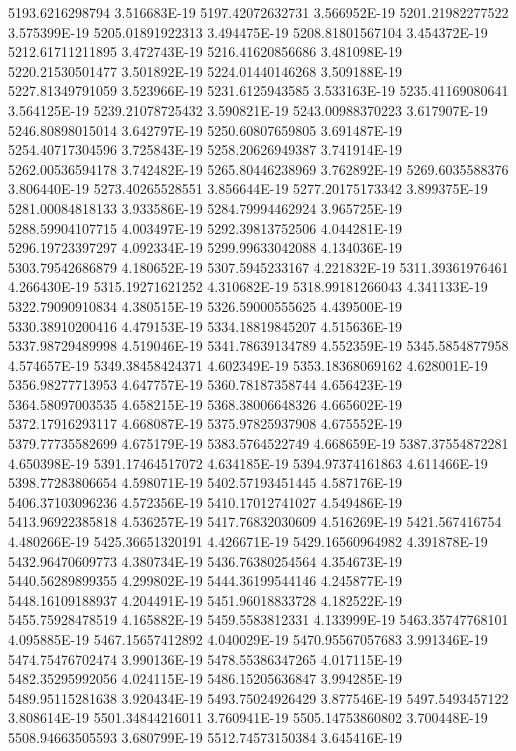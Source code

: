 5193.6216298794  3.516683E-19
5197.42072632731  3.566952E-19
5201.21982277522  3.575399E-19
5205.01891922313  3.494475E-19
5208.81801567104  3.454372E-19
5212.61711211895  3.472743E-19
5216.41620856686  3.481098E-19
5220.21530501477  3.501892E-19
5224.01440146268  3.509188E-19
5227.81349791059  3.523966E-19
5231.6125943585  3.533163E-19
5235.41169080641  3.564125E-19
5239.21078725432  3.590821E-19
5243.00988370223  3.617907E-19
5246.80898015014  3.642797E-19
5250.60807659805  3.691487E-19
5254.40717304596  3.725843E-19
5258.20626949387  3.741914E-19
5262.00536594178  3.742482E-19
5265.80446238969  3.762892E-19
5269.6035588376  3.806440E-19
5273.40265528551  3.856644E-19
5277.20175173342  3.899375E-19
5281.00084818133  3.933586E-19
5284.79994462924  3.965725E-19
5288.59904107715  4.003497E-19
5292.39813752506  4.044281E-19
5296.19723397297  4.092334E-19
5299.99633042088  4.134036E-19
5303.79542686879  4.180652E-19
5307.5945233167  4.221832E-19
5311.39361976461  4.266430E-19
5315.19271621252  4.310682E-19
5318.99181266043  4.341133E-19
5322.79090910834  4.380515E-19
5326.59000555625  4.439500E-19
5330.38910200416  4.479153E-19
5334.18819845207  4.515636E-19
5337.98729489998  4.519046E-19
5341.78639134789  4.552359E-19
5345.5854877958  4.574657E-19
5349.38458424371  4.602349E-19
5353.18368069162  4.628001E-19
5356.98277713953  4.647757E-19
5360.78187358744  4.656423E-19
5364.58097003535  4.658215E-19
5368.38006648326  4.665602E-19
5372.17916293117  4.668087E-19
5375.97825937908  4.675552E-19
5379.77735582699  4.675179E-19
5383.5764522749  4.668659E-19
5387.37554872281  4.650398E-19
5391.17464517072  4.634185E-19
5394.97374161863  4.611466E-19
5398.77283806654  4.598071E-19
5402.57193451445  4.587176E-19
5406.37103096236  4.572356E-19
5410.17012741027  4.549486E-19
5413.96922385818  4.536257E-19
5417.76832030609  4.516269E-19
5421.567416754  4.480266E-19
5425.36651320191  4.426671E-19
5429.16560964982  4.391878E-19
5432.96470609773  4.380734E-19
5436.76380254564  4.354673E-19
5440.56289899355  4.299802E-19
5444.36199544146  4.245877E-19
5448.16109188937  4.204491E-19
5451.96018833728  4.182522E-19
5455.75928478519  4.165882E-19
5459.5583812331  4.133999E-19
5463.35747768101  4.095885E-19
5467.15657412892  4.040029E-19
5470.95567057683  3.991346E-19
5474.75476702474  3.990136E-19
5478.55386347265  4.017115E-19
5482.35295992056  4.024115E-19
5486.15205636847  3.994285E-19
5489.95115281638  3.920434E-19
5493.75024926429  3.877546E-19
5497.5493457122  3.808614E-19
5501.34844216011  3.760941E-19
5505.14753860802  3.700448E-19
5508.94663505593  3.680799E-19
5512.74573150384  3.645416E-19
